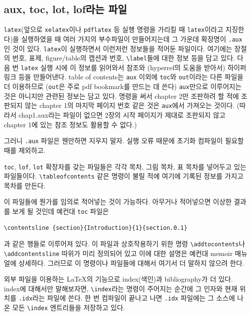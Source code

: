 \subsection{aux, toc, lot, lof라는 파일}

\texttt{latex}({\small 앞으로 \texttt{xelatex}이나 \texttt{pdflatex} 등 실행 명령을 가리킬 때
\texttt{latex}이라고 지징한다})을 실행하였을 때 여러 가지의 부수파일이 만들어지는데
그 가운데 확장명이 \verb|.aux|인 것이 있다. \texttt{latex}이 실행하면서 이런저런 정보들을
적어둔 파일이다. 여기에는 장절의 번호, 표제, figure/table의 캡션과 번호, \verb|\label|들에 대한
정보 등을 담고 있다. 
다음 번 \texttt{latex} 실행 시에 이 정보를 읽어와서 참조와 (\textsf{hyperref}의 도움을 받아서)
하이퍼링크 등을 만들어낸다. table of contents는 \verb|aux| 이외에 \verb|toc|와 \verb|out|이라는 
다른 파일을 더 이용하므로 (\verb|out|은 주로 pdf bookmark를 만드는 데 쓴다) \verb|aux|만으로 이루어지는 것은 아니지만 관련된 정보는 담고 있다.
\verb|| 명령을 써서 chapter 2만 조판하려 할 적에 조판되지 않는 chapter 1의 
마지막 페이지 번호 같은 것은 \verb|aux|에서 가져오는 것이다. (따라서 chap1.aux라는 파일이
없으면 2장의 시작 페이지가 제대로 조판되지 않고 chapter 1에 있는 참조 정보도 활용할 수 없다.)

그러니 \verb|.aux| 파일은 웬만하면 지우지 말자. 실행 오류 때문에 초기화 컴파일이 필요할 때를 제외하고.

\verb|toc|, \verb|lof|, \verb|lot| 확장자를 갖는 파일들은 각각 목차, 그림 목차, 표 목차를
넣어두고 있는 파일들이다. \verb|\tableofcontents| 같은 명령이 불릴 적에 여기에 기록된 정보를 가지고
목차를 만든다. 

이 파일들에 뭔가를 임의로 적어넣는 것이 가능하다. 아무거나 적어넣으면 이상한 결과를 보게 될 것인데
예컨대 \verb|toc| 파일은 
\begin{verbatim}
\contentsline {section}{Introduction}{1}{section.0.1}
\end{verbatim}
과 같은 행들로 이루어져 있다. 이 파일과 상호작용하기 위한 명령 \verb|\addtocontents|나 
\verb|\addcontentsline| 따위가 미리 정의되어 있고 이에 대한 설명은 예컨대 memoir 매뉴얼에
상세하다. 그러므로 이 명령이나 파일들에 대해서 여기서 더 말하지 않으려 한다.

외부 파일을 이용하는 \LaTeX 의 기능으로 index(색인)과 bibliography가 더 있다. index에
대해서만 말해보자면, \verb|\index|라는 명령이 주어지는 순간에 그 인자와 현재 위치를
\verb|.idx|라는 파일에 쓴다. 한 번 컴파일이 끝나고 나면 \verb|.idx| 파일에는
그 소스에 나온 모든 \verb|\index| 엔트리들을 저장하고 있다.

